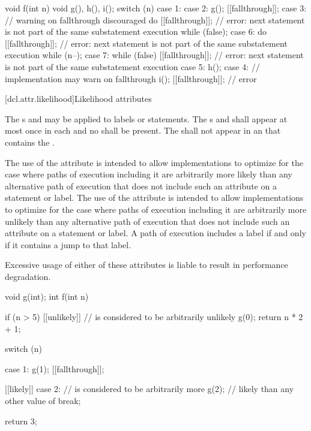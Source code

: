 \pnum
\begin{example}
\begin{codeblock}
void f(int n) {
  void g(), h(), i();
  switch (n) {
  case 1:
  case 2:
    g();
    [[fallthrough]];
  case 3:                       // warning on fallthrough discouraged
    do {
      [[fallthrough]];          // error: next statement is not part of the same substatement execution
    } while (false);
  case 6:
    do {
      [[fallthrough]];          // error: next statement is not part of the same substatement execution
    } while (n--);
  case 7:
    while (false) {
      [[fallthrough]];          // error: next statement is not part of the same substatement execution
    }
  case 5:
    h();
  case 4:                       // implementation may warn on fallthrough
    i();
    [[fallthrough]];            // error
  }
}
\end{codeblock}
\end{example}

[dcl.attr.likelihood]{Likelihood attributes}%

\pnum
The s
 and 
may be applied to labels or statements.
The s
 and 
shall appear at most once in each 
and no  shall be present.
The  
shall not appear in an 
that contains the  .

\pnum
\recommended
The use of the  attribute
is intended to allow implementations to optimize for
the case where paths of execution including it
are arbitrarily more likely
than any alternative path of execution
that does not include such an attribute on a statement or label.
The use of the  attribute
is intended to allow implementations to optimize for
the case where paths of execution including it
are arbitrarily more unlikely
than any alternative path of execution
that does not include such an attribute on a statement or label.
A path of execution includes a label
if and only if it contains a jump to that label.
\begin{note}
Excessive usage of either of these attributes
is liable to result in performance degradation.
\end{note}

\pnum
\begin{example}
\begin{codeblock}
void g(int);
int f(int n) {
  if (n > 5) [[unlikely]] {     //  is considered to be arbitrarily unlikely
    g(0);
    return n * 2 + 1;
  }

  switch (n) {
  case 1:
    g(1);
    [[fallthrough]];

  [[likely]] case 2:            //  is considered to be arbitrarily more
    g(2);                       // likely than any other value of 
    break;
  }
  return 3;
}
\end{codeblock}
\end{example}

